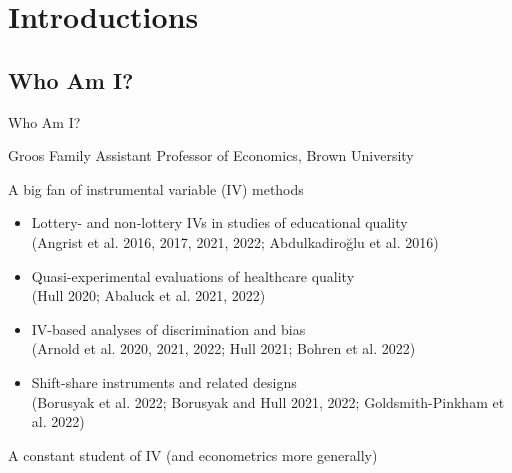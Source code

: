 \documentclass{beamer}
\begin{document}

\section{Introductions}

\subsection{Who Am I?}
\begin{frame}{Who Am I?}

Groos Family Assistant Professor of Economics, Brown University\pause

A big fan of instrumental variable (IV) methods\pause
\begin{itemize}
  \item Lottery- and non-lottery IVs in studies of educational quality \\ {\scriptsize \textcolor{red!75!green!50!blue!25!gray}{(Angrist et al. 2016, 2017, 2021, 2022; Abdulkadiro\u{g}lu et al. 2016)}}
  \item Quasi-experimental evaluations of healthcare quality \\ {\scriptsize \textcolor{red!75!green!50!blue!25!gray}{(Hull 2020; Abaluck et al. 2021, 2022)}}
  \item IV-based analyses of discrimination and bias \\ {\scriptsize \textcolor{red!75!green!50!blue!25!gray}{(Arnold et al. 2020, 2021, 2022; Hull 2021; Bohren et al. 2022)}}
  \item Shift-share instruments and related designs \\ {\scriptsize \textcolor{red!75!green!50!blue!25!gray}{(Borusyak et al. 2022; Borusyak and Hull 2021, 2022; Goldsmith-Pinkham et al. 2022)}}
\end{itemize}\pause

A constant student of IV (and econometrics more generally)

\end{frame}
\end{document}
